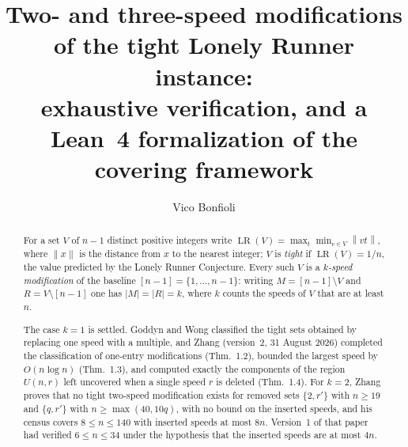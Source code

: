 \documentclass[11pt]{amsart}
\theoremstyle{plain}
\theoremstyle{definition}
\newcommand{\LR}{\operatorname{LR}}
\newcommand{\nrm}[1]{\left\lVert #1 \right\rVert}
\begin{document}
\title{Two- and three-speed modifications of the tight Lonely Runner instance:\\
exhaustive verification, and a Lean~4 formalization of the covering framework}
\author{Vico Bonfioli}

\begin{abstract}
For a set $V$ of $n-1$ distinct positive integers write $\LR(V)=\max_t \min_{v\in V}\nrm{vt}$, where
$\nrm{x}$ is the distance from $x$ to the nearest integer; $V$ is \emph{tight} if $\LR(V)=1/n$, the
value predicted by the Lonely Runner Conjecture. Every such $V$ is a \emph{$k$-speed modification}
of the baseline $[n-1]=\{1,\dots,n-1\}$: writing $M=[n-1]\setminus V$ and $R=V\setminus[n-1]$ one
has $|M|=|R|=k$, where $k$ counts the speeds of $V$ that are at least $n$.

The case $k=1$ is settled. Goddyn and Wong \cite{gw} classified the tight sets obtained by replacing
one speed with a multiple, and Zhang \cite{zhang} (version~2, 31 August 2026) completed the
classification of one-entry modifications (Thm.~1.2), bounded the largest speed by $O(n\log n)$
(Thm.~1.3), and computed exactly the components of the region $U(n,r)$ left uncovered when a single
speed $r$ is deleted (Thm.~1.4). For $k=2$, Zhang \cite[Thms.~7.5, 7.10]{zhang} proves that no tight
two-speed modification exists for removed sets $\{2,r'\}$ with $n\ge19$ and $\{q,r'\}$ with
$n\ge\max(40,10q)$, with no bound on the inserted speeds, and his census \cite[Thm.~7.13]{zhang}
covers $8\le n\le140$ with inserted speeds at most $8n$. Version~1 of that paper had verified
$6\le n\le34$ under the hypothesis that the inserted speeds are at most $4n$.


\end{abstract}
\end{document}
